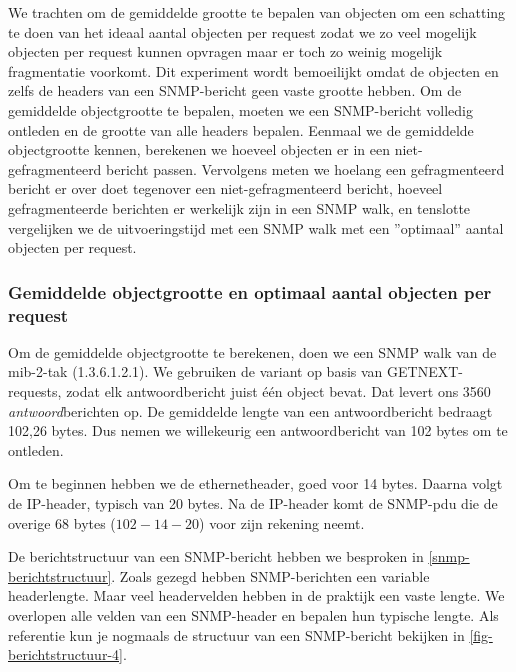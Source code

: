 We trachten om de gemiddelde grootte te bepalen van objecten om een schatting te doen van het ideaal aantal objecten per request
zodat we zo veel mogelijk objecten per request kunnen opvragen maar er toch zo weinig mogelijk fragmentatie voorkomt.
Dit experiment wordt bemoeilijkt omdat de objecten en zelfs de headers van een SNMP-bericht geen vaste grootte hebben.
Om de gemiddelde objectgrootte te bepalen, moeten we een SNMP-bericht volledig ontleden en de grootte van alle headers bepalen.
Eenmaal we de gemiddelde objectgrootte kennen, berekenen we hoeveel objecten er in een niet-gefragmenteerd bericht passen.
Vervolgens meten we hoelang een gefragmenteerd bericht er over doet tegenover een niet-gefragmenteerd bericht,
hoeveel gefragmenteerde berichten er werkelijk zijn in een SNMP walk,
en tenslotte vergelijken we de uitvoeringstijd met een SNMP walk met een ''optimaal'' aantal objecten per request.


\subsubsection{Gemiddelde objectgrootte en optimaal aantal objecten per request}

Om de gemiddelde objectgrootte te berekenen, doen we een SNMP walk van de mib-2-tak (1.3.6.1.2.1).
We gebruiken de variant op basis van GETNEXT-requests, zodat elk antwoordbericht juist één object bevat.
Dat levert ons 3560 \emph{antwoord}berichten op.
De gemiddelde lengte van een antwoordbericht bedraagt 102,26 bytes.
Dus nemen we willekeurig een antwoordbericht van 102 bytes om te ontleden.

Om te beginnen hebben we de ethernetheader, goed voor 14 bytes\cite{ethernet-header}.
Daarna volgt de IP-header, typisch van 20 bytes\cite{ipv4-header-wiki}.
Na de IP-header komt de SNMP-\gls{pdu} die de overige 68 bytes ($ 102 - 14 - 20$) voor zijn rekening neemt.

De berichtstructuur van een SNMP-bericht hebben we besproken in \cref{snmp-berichtstructuur}.
Zoals gezegd hebben SNMP-berichten een variable headerlengte.
Maar veel headervelden hebben in de praktijk een vaste lengte.
We overlopen alle velden van een SNMP-header en bepalen hun typische lengte.
Als referentie kun je nogmaals de structuur van een SNMP-bericht bekijken in \cref{fig-berichtstructuur-4}.

